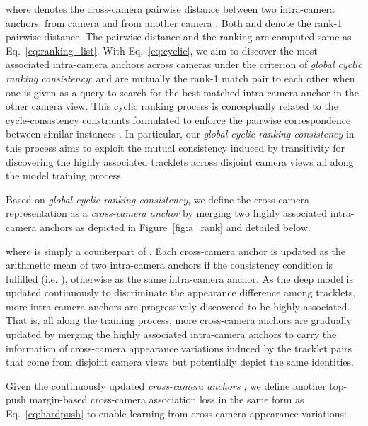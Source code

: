\documentclass{bmvc2k}
\begin{document}
where  denotes the cross-camera pairwise distance between two {intra-camera anchors}:  from camera  and  from another camera . 
Both  and  denote the rank-1 pairwise distance. 
The pairwise distance and the ranking are computed same as Eq.~\eqref{eq:ranking_list}. 
With Eq.~\eqref{eq:cyclic}, we aim to discover the most associated intra-camera anchors across cameras
under the criterion of {\em global cyclic ranking consistency}:  
 and  are mutually the rank-1 match pair to each other 
when one is given as a query to search for the best-matched {intra-camera
anchor} in the other camera view. This cyclic ranking process is conceptually related to
 the cycle-consistency constraints formulated to enforce the pairwise correspondence between similar instances \cite{zhou2016learning,sener2016learning,godard2017unsupervised}. 
In particular, our {\em global cyclic ranking consistency} in this process 
aims to exploit the mutual consistency induced by transitivity for discovering the highly associated tracklets across disjoint camera views all along the model training process. 

\vspace{0.1em}
Based on {\em global cyclic ranking consistency}, we define the cross-camera representation as a {\em cross-camera anchor}  by merging two highly associated {intra-camera anchors} as depicted in Figure~\ref{fig:a_rank} and detailed below.

where  is simply a counterpart of .
Each {cross-camera anchor} is updated as the arithmetic mean of two {intra-camera anchors} if the consistency condition is fulfilled (i.e. ),  
otherwise as the same {intra-camera anchor}. 
As the deep model is updated continuously to
discriminate the appearance difference among tracklets, 
more intra-camera anchors are progressively discovered to be highly associated. That is, all along the training process, more {cross-camera anchors} are gradually updated by 
merging the highly associated {intra-camera anchors} 
to carry the information of cross-camera appearance variations induced by the tracklet pairs
that come from disjoint camera views but potentially depict the same identities.

\vspace{0.1em}
Given the continuously updated {\em cross-camera anchors}
, 
we define another top-push margin-based cross-camera association loss 
in the same form as Eq.~\eqref{eq:hardpush} 
to enable learning from cross-camera appearance variations:  
\end{document}
